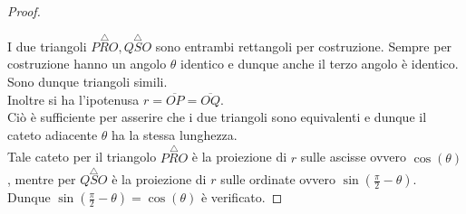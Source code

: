 \begin{proposition}
\begin{proof}
\begin{center}
		\end{center}
		I due triangoli $ \overset{\triangle}{PRO}, \overset{\triangle}{QSO} $ sono entrambi rettangoli per costruzione.
		Sempre per costruzione hanno un angolo $\theta$ identico e dunque anche il terzo angolo è identico. Sono dunque triangoli simili.\\
		Inoltre si ha l'ipotenusa $ r = \overline{OP} = \overline{OQ} $.\\
		Ciò è sufficiente per asserire che i due triangoli sono equivalenti e dunque il cateto adiacente $\theta$ ha la stessa lunghezza.\\
		Tale cateto per il triangolo $\overset{\triangle}{PRO}$ è la proiezione di $r$ sulle ascisse ovvero $\cos(\theta)$,
		mentre per $\overset{\triangle}{QSO}$ è la proiezione di $r$ sulle ordinate ovvero $\sin(\frac{\pi}{2} - \theta)$.\\
		Dunque $ \sin(\frac{\pi}{2} - \theta) = \cos(\theta) $ è verificato.
	\end{proof}
\end{proposition}